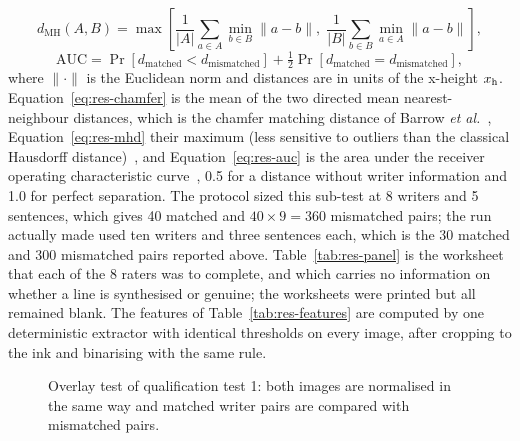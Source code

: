             \begin{equation}
            \label{eq:res-mhd}
            d_{\mathrm{MH}}(A,B)=\max\left[\frac{1}{\lvert A\rvert}\sum_{a\in A}\min_{b\in B}\lVert a-b\rVert,\;\frac{1}{\lvert B\rvert}\sum_{b\in B}\min_{a\in A}\lVert a-b\rVert\right],
            \end{equation}
            \begin{equation}
            \label{eq:res-auc}
            \mathrm{AUC}=\Pr\left[d_{\mathrm{matched}}<d_{\mathrm{mismatched}}\right]+\tfrac{1}{2}\Pr\left[d_{\mathrm{matched}}=d_{\mathrm{mismatched}}\right],
            \end{equation}
            where $\lVert\cdot\rVert$ is the Euclidean norm and distances are in units of the x-height $x_{\mathrm{h}}$.
            Equation~\ref{eq:res-chamfer} is the mean of the two directed mean nearest-neighbour distances, which is the chamfer matching distance of Barrow \emph{et al.}~\cite{barrow1977}, Equation~\ref{eq:res-mhd} their maximum (less sensitive to outliers than the classical Hausdorff distance)~\cite{dubuisson1994}, and Equation~\ref{eq:res-auc} is the area under the receiver operating characteristic curve~\cite{fawcett2006}, 0.5 for a distance without writer information and 1.0 for perfect separation.
            The protocol sized this sub-test at 8 writers and 5 sentences, which gives 40 matched and $40\times9=360$ mismatched pairs; the run actually made used ten writers and three sentences each, which is the 30 matched and 300 mismatched pairs reported above.
            Table~\ref{tab:res-panel} is the worksheet that each of the 8 raters was to complete, and which carries no information on whether a line is synthesised or genuine; the worksheets were printed but all remained blank.
            The features of Table~\ref{tab:res-features} are computed by one deterministic extractor with identical thresholds on every image, after cropping to the ink and binarising with the same rule.

\begin{figure}[h]
\centering
{}
\caption{Overlay test of qualification test 1: both images are normalised in the same way and matched writer pairs are compared with mismatched pairs.}
\label{fig:res-overlay}
\end{figure}

